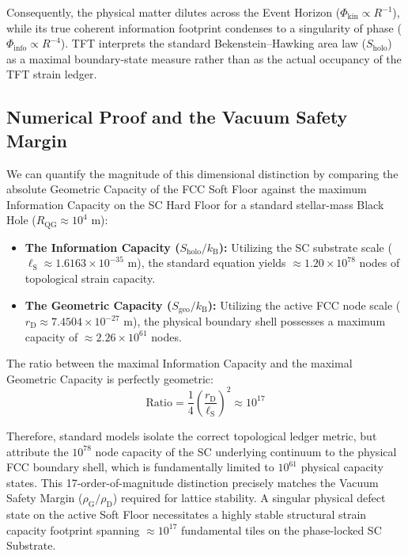 Consequently, the physical matter dilutes across the Event Horizon ($\Phi_{\mathrm{kin}} \propto R^{-1}$), while its true coherent information footprint condenses to a singularity of phase ($\Phi_{\mathrm{info}} \propto R^{-4}$). TFT interprets the standard Bekenstein--Hawking area law ($S_{\mathrm{holo}}$) \cite{Bekenstein_1973, Hawking_1975} as a maximal boundary-state measure rather than as the actual occupancy of the TFT strain ledger.

\subsection{Numerical Proof and the Vacuum Safety Margin}

We can quantify the magnitude of this dimensional distinction by comparing the absolute Geometric Capacity of the FCC Soft Floor against the maximum Information Capacity on the SC Hard Floor for a standard stellar-mass Black Hole ($R_{\mathrm{QG}} \approx 10^4$ m):

\begin{itemize}
    \item \textbf{The Information Capacity ($S_{\mathrm{holo}}/k_{\mathrm{B}}$):} Utilizing the SC substrate scale ($\ell_{\mathrm{S}} \approx 1.6163 \times 10^{-35}$ m), the standard equation yields $\approx 1.20 \times 10^{78}$ nodes of topological strain capacity.
    \item \textbf{The Geometric Capacity ($S_{\mathrm{geo}}/k_{\mathrm{B}}$):} Utilizing the active FCC node scale ($r_{\mathrm{D}} \approx 7.4504 \times 10^{-27}$ m), the physical boundary shell possesses a maximum capacity of $\approx 2.26 \times 10^{61}$ nodes.
\end{itemize}

The ratio between the maximal Information Capacity and the maximal Geometric Capacity is perfectly geometric:
\begin{equation}
    \text{Ratio} = \frac{1}{4}\left(\frac{r_{\mathrm{D}}}{\ell_{\mathrm{S}}}\right)^2 \approx 10^{17}
\end{equation}

Therefore, standard models isolate the correct topological ledger metric, but attribute the $10^{78}$ node capacity of the SC underlying continuum to the physical FCC boundary shell, which is fundamentally limited to $10^{61}$ physical capacity states. This 17-order-of-magnitude distinction precisely matches the Vacuum Safety Margin ($\rho_{\mathrm{G}} / \rho_{\mathrm{D}}$) required for lattice stability. A singular physical defect state on the active Soft Floor necessitates a highly stable structural strain capacity footprint spanning $\approx 10^{17}$ fundamental tiles on the phase-locked SC Substrate.

